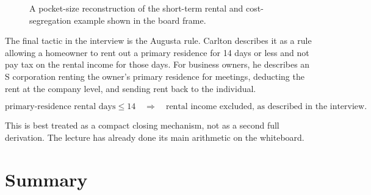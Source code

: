 \begin{figure}
\centering
{}
\caption{A pocket-size reconstruction of the short-term rental and cost-segregation example shown in the board frame.}
\label{fig:str-flow}
\end{figure}

The final tactic in the interview is the Augusta rule. Carlton describes it as a rule allowing a homeowner to rent out a primary residence for 14 days or less and not pay tax on the rental income for those days. For business owners, he describes an S corporation renting the owner's primary residence for meetings, deducting the rent at the company level, and sending rent back to the individual.

\begin{equation}
\text{primary-residence rental days}\leq 14
\quad\Longrightarrow\quad
\text{rental income excluded, as described in the interview}.
\end{equation}

This is best treated as a compact closing mechanism, not as a second full derivation. The lecture has already done its main arithmetic on the whiteboard.

\section{Summary}


